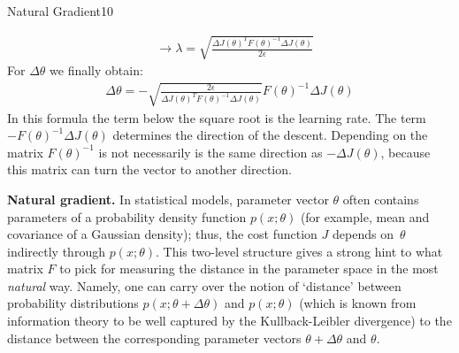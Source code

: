 \begin{questions}
\begin{question}[bonus]{Natural Gradient}{10}
\begin{answer}
\begin{align*}
&\rightarrow \lambda = \sqrt{\frac{\Delta J (\theta)^T F(\theta)^{-1} \Delta J(\theta)}{2 \epsilon}}
\end{align*}
For $\Delta \theta$ we finally obtain:
\begin{align*}
\Delta \theta = - \sqrt{\frac{2\epsilon}{\Delta J(\theta)^TF(\theta)^{-1}\Delta J(\theta)}}F(\theta)^{-1}\Delta J(\theta)
\end{align*}
In this formula the term below the square root is the learning rate. The term $-F(\theta)^{-1}\Delta J(\theta)$ determines the direction of the descent. Depending on the matrix $F(\theta)^{-1}$ is not necessarily is the same direction as $-\Delta J(\theta)$, because this matrix can turn the vector to another direction.
\end{answer}
\textbf{Natural gradient.}
In statistical models, parameter vector $\theta$ often
contains parameters of a probability density function $p(x; \theta)$
(for example, mean and covariance of a Gaussian density);
thus, the cost function $J$ depends on~$\theta$ indirectly
through $p(x; \theta)$.
This two-level structure gives a strong hint to what matrix $F$
to pick for measuring the distance in the parameter space
in the most \textit{natural} way.
Namely, one can carry over the notion of `distance' between
probability distributions $p(x; \theta + \Delta \theta)$
and $p(x; \theta)$ (which is known from information theory
to be well captured by the Kullback-Leibler divergence)
to the distance between the corresponding parameter vectors
$\theta + \Delta \theta$ and $\theta$.


\end{question}
\end{questions}
